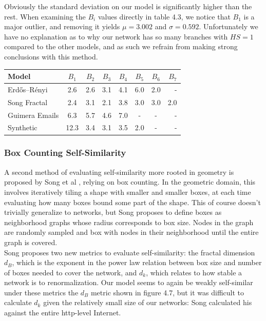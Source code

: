 \documentclass[12pt,twoside]{report}
\begin{document}
Obviously the standard deviation on our model is significantly higher than the rest. When examining the $B_i$ values directly in table 4.3, we notice that $B_1$ is a major outlier, and removing it yields $\mu = 3.002$ and $\sigma = 0.592$. Unfortunately we have no explanation as to why our network has so many branches with $HS = 1$ compared to the other models, and as such we refrain from making strong conclusions with this method. \\

\begin{center}
\begin{tabular}{l*{6}{c}r}
Model              & $B_1$ & $B_2$ & $B_3$ & $B_4$ & $B_5$ & $B_6$ & $B_7$ \\
\hline
Erdős–Rényi      & 2.6  & 2.6 & 3.1 & 4.1 & 6.0 & 2.0 & -  \\
Song Fractal      & 2.4  & 3.1 & 2.1 & 3.8 & 3.0 & 3.0 & 2.0  \\
Guimera Emails      & 6.3  & 5.7 & 4.6 & 7.0 & - & - & -  \\
Synthetic      & 12.3  & 3.4 & 3.1 & 3.5 & 2.0 & - & -  \\
\end{tabular}
\end{center}

\subsubsection{Box Counting Self-Similarity}

A second method of evaluating self-similarity more rooted in geometry is proposed by Song et al \cite{song2005self}, relying on box counting. In the geometric domain, this involves iteratively tiling a shape with smaller and smaller boxes, at each time evaluating how many boxes bound some part of the shape. This of course doesn't trivially generalize to networks, but Song proposes to define boxes as neighborhood graphs whose radius corresponds to box size. Nodes in the graph are randomly sampled and box with nodes in their neighborhood until the entire graph is covered. \\

Song proposes two new metrics to evaluate self-similarity: the fractal dimension $d_B$, which is the exponent in the power law relation between box size and number of boxes needed to cover the network, and $d_k$, which relates to how stable a network is to renormalization. Our model seems to again be weakly self-similar under these metrics the $d_B$ metric shown in figure 4.7, but it was difficult to calculate $d_k$ given the relatively small size of our networks: Song calculated his against the entire http-level  Internet. \\
\end{document}
